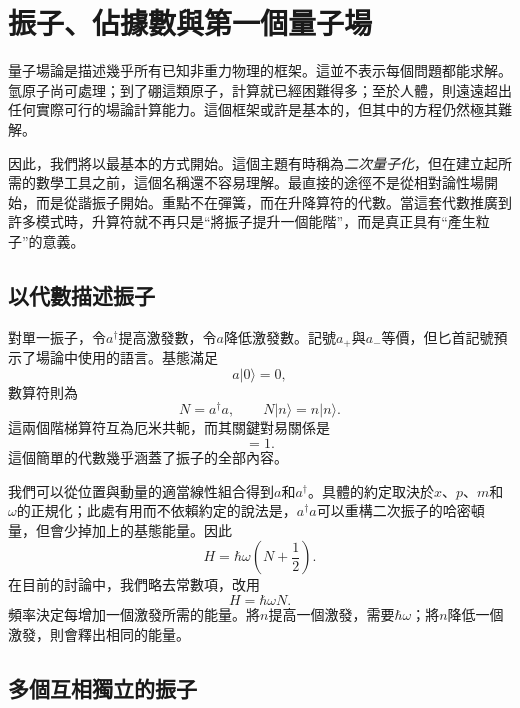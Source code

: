 \chapter{振子、佔據數與第一個量子場}

量子場論是描述幾乎所有已知非重力物理的框架。這並不表示每個問題都能求解。氫原子尚可處理；到了硼這類原子，計算就已經困難得多；至於人體，則遠遠超出任何實際可行的場論計算能力。這個框架或許是基本的，但其中的方程仍然極其難解。

因此，我們將以最基本的方式開始。這個主題有時稱為\emph{二次量子化}，但在建立起所需的數學工具之前，這個名稱還不容易理解。最直接的途徑不是從相對論性場開始，而是從諧振子開始。重點不在彈簧，而在升降算符的代數。當這套代數推廣到許多模式時，升算符就不再只是``將振子提升一個能階''，而是真正具有``產生粒子''的意義。

\section{以代數描述振子}

對單一振子，令\(a^\dagger\)提高激發數，令\(a\)降低激發數。記號\(a_+\)與\(a_-\)等價，但匕首記號預示了場論中使用的語言。基態滿足
\begin{equation}
a|0\rangle=0,
\end{equation}
數算符則為
\begin{equation}
N=a^\dagger a,
\qquad
N|n\rangle=n|n\rangle.
\end{equation}
這兩個階梯算符互為厄米共軛，而其關鍵對易關係是
\begin{equation}
[a,a^\dagger]=1.
\label{eq:l06-single-commutator}
\end{equation}
這個簡單的代數幾乎涵蓋了振子的全部內容。

我們可以從位置與動量的適當線性組合得到\(a\)和\(a^\dagger\)。具體的約定取決於\(x\)、\(p\)、\(m\)和\(\omega\)的正規化；此處有用而不依賴約定的說法是，\(a^\dagger a\)可以重構二次振子的哈密頓量，但會少掉加上的基態能量。因此
\begin{equation}
H=\hbar\omega\left(N+\frac12\right).
\end{equation}
在目前的討論中，我們略去常數項，改用
\begin{equation}
H=\hbar\omega N.
\label{eq:l06-one-oscillator-hamiltonian}
\end{equation}
頻率決定每增加一個激發所需的能量。將\(n\)提高一個激發，需要\(\hbar\omega\)；將\(n\)降低一個激發，則會釋出相同的能量。

\section{多個互相獨立的振子}

